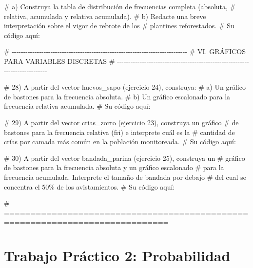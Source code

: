 \documentclass[
  spanish,
  letterpaper,
  DIV=11,
  numbers=noendperiod]{scrreprt}
\newenvironment{Shaded}{\begin{snugshade}}{\end{snugshade}}
\newcommand{\CommentTok}[1]{\textcolor[rgb]{0.37,0.37,0.37}{#1}}
\begin{document}
\begin{Shaded}
\begin{Highlighting}[]
\CommentTok{\#     a) Construya la tabla de distribución de frecuencias completa (absoluta,}
\CommentTok{\#        relativa, acumulada y relativa acumulada).}
\CommentTok{\#     b) Redacte una breve interpretación sobre el vigor de rebrote de los}
\CommentTok{\#        plantines reforestados.}
\CommentTok{\# Su código aquí:}


\CommentTok{\# {-}{-}{-}{-}{-}{-}{-}{-}{-}{-}{-}{-}{-}{-}{-}{-}{-}{-}{-}{-}{-}{-}{-}{-}{-}{-}{-}{-}{-}{-}{-}{-}{-}{-}{-}{-}{-}{-}{-}{-}{-}{-}{-}{-}{-}{-}{-}{-}{-}{-}{-}{-}{-}{-}{-}{-}{-}{-}{-}{-}{-}{-}{-}{-}{-}{-}{-}{-}{-}{-}{-}{-}{-}{-}{-}{-}{-}}
\CommentTok{\# VI. GRÁFICOS PARA VARIABLES DISCRETAS}
\CommentTok{\# {-}{-}{-}{-}{-}{-}{-}{-}{-}{-}{-}{-}{-}{-}{-}{-}{-}{-}{-}{-}{-}{-}{-}{-}{-}{-}{-}{-}{-}{-}{-}{-}{-}{-}{-}{-}{-}{-}{-}{-}{-}{-}{-}{-}{-}{-}{-}{-}{-}{-}{-}{-}{-}{-}{-}{-}{-}{-}{-}{-}{-}{-}{-}{-}{-}{-}{-}{-}{-}{-}{-}{-}{-}{-}{-}{-}{-}}

\CommentTok{\# 28) A partir del vector \textquotesingle{}huevos\_sapo\textquotesingle{} (ejercicio 24), construya:}
\CommentTok{\#     a) Un gráfico de bastones para la frecuencia absoluta.}
\CommentTok{\#     b) Un gráfico escalonado para la frecuencia relativa acumulada.}
\CommentTok{\# Su código aquí:}


\CommentTok{\# 29) A partir del vector \textquotesingle{}crias\_zorro\textquotesingle{} (ejercicio 23), construya un gráfico}
\CommentTok{\#     de bastones para la frecuencia relativa (fri) e interprete cuál es la}
\CommentTok{\#     cantidad de crías por camada más común en la población monitoreada.}
\CommentTok{\# Su código aquí:}


\CommentTok{\# 30) A partir del vector \textquotesingle{}bandada\_parina\textquotesingle{} (ejercicio 25), construya un}
\CommentTok{\#     gráfico de bastones para la frecuencia absoluta y un gráfico escalonado}
\CommentTok{\#     para la frecuencia acumulada. Interprete el tamaño de bandada por debajo}
\CommentTok{\#     del cual se concentra el 50\% de los avistamientos.}
\CommentTok{\# Su código aquí:}

\CommentTok{\# =============================================================================}
\end{Highlighting}
\end{Shaded}


\chapter{Trabajo Práctico 2:
Probabilidad}\label{trabajo-pruxe1ctico-2-probabilidad}
\end{document}
